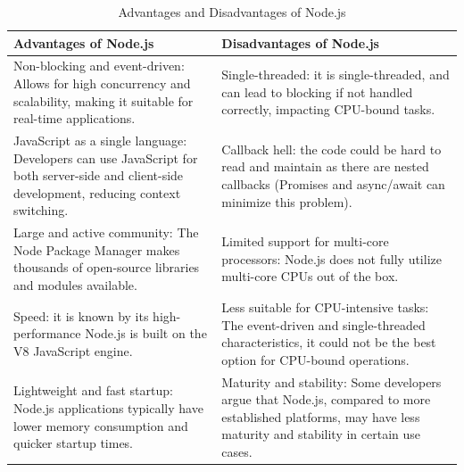 \begin{table}[H]
    \centering
    \begin{tabularx}{\textwidth}{|X|X|}
        \hline
        \textbf{Advantages of Node.js}                                                                                                               & \textbf{Disadvantages of Node.js}                                                                                                                              \\
        \hline
        Non-blocking and event-driven: Allows for high concurrency and scalability, making it suitable for real-time applications.                   & Single-threaded: it is single-threaded, and can lead to blocking if not handled correctly, impacting CPU-bound tasks.                                   \\
        \hline
        JavaScript as a single language: Developers can use JavaScript for both server-side and client-side development, reducing context switching. & Callback hell: the code could be hard to read and maintain as there are nested callbacks (Promises and async/await can minimize this problem).                      \\
        \hline
        Large and active community: The Node Package Manager makes thousands of open-source libraries and modules available.                 & Limited support for multi-core processors: Node.js does not fully utilize multi-core CPUs out of the box.                                                      \\
        \hline
        Speed: it is known by its high-performance Node.js is built on the V8 JavaScript engine.                                               & Less suitable for CPU-intensive tasks: The event-driven and single-threaded characteristics, it could not be the best option for CPU-bound operations.           \\
        \hline
        Lightweight and fast startup: Node.js applications typically have lower memory consumption and quicker startup times.                        & Maturity and stability: Some developers argue that Node.js, compared to more established platforms, may have less maturity and stability in certain use cases. \\
        \hline
    \end{tabularx}
    \label{tab:node-js-advantages-disadvantages}
    \caption{Advantages and Disadvantages of Node.js}
\end{table}




